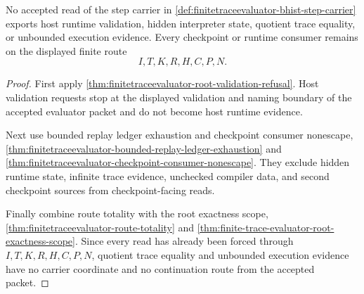 \begin{theorem}
\label{thm:finitetraceevaluator-nonescape-boundary}
No accepted read of the step carrier in \autoref{def:finitetraceevaluator-bhist-step-carrier} exports host runtime validation, hidden interpreter state, quotient trace equality, or unbounded execution evidence. Every checkpoint or runtime consumer remains on the displayed finite route
$$
I,T,K,R,H,C,P,N.
$$
\end{theorem}
\begin{proof}
First apply \autoref{thm:finitetraceevaluator-root-validation-refusal}. Host validation requests stop at the displayed validation and naming boundary of the accepted evaluator packet and do not become host runtime evidence.

Next use bounded replay ledger exhaustion and checkpoint consumer nonescape, \autoref{thm:finitetraceevaluator-bounded-replay-ledger-exhaustion} and \autoref{thm:finitetraceevaluator-checkpoint-consumer-nonescape}. They exclude hidden runtime state, infinite trace evidence, unchecked compiler data, and second checkpoint sources from checkpoint-facing reads.

Finally combine route totality with the root exactness scope, \autoref{thm:finitetraceevaluator-route-totality} and \autoref{thm:finite-trace-evaluator-root-exactness-scope}. Since every read has already been forced through $I,T,K,R,H,C,P,N$, quotient trace equality and unbounded execution evidence have no carrier coordinate and no continuation route from the accepted packet.
\end{proof}
